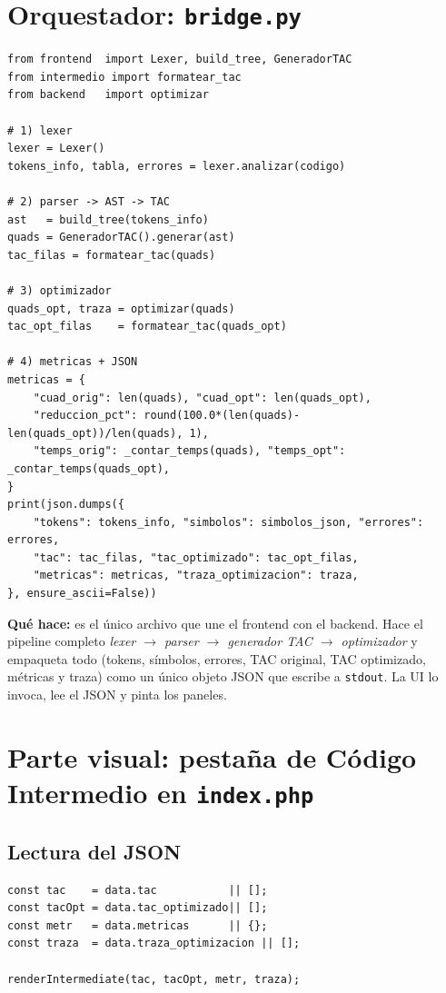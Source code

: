 \documentclass[11pt,a4paper]{article}
\begin{document}
\section{Orquestador: \texttt{bridge.py}}

\begin{lstlisting}[style=py]
from frontend  import Lexer, build_tree, GeneradorTAC
from intermedio import formatear_tac
from backend   import optimizar

# 1) lexer
lexer = Lexer()
tokens_info, tabla, errores = lexer.analizar(codigo)

# 2) parser -> AST -> TAC
ast   = build_tree(tokens_info)
quads = GeneradorTAC().generar(ast)
tac_filas = formatear_tac(quads)

# 3) optimizador
quads_opt, traza = optimizar(quads)
tac_opt_filas    = formatear_tac(quads_opt)

# 4) metricas + JSON
metricas = {
    "cuad_orig": len(quads), "cuad_opt": len(quads_opt),
    "reduccion_pct": round(100.0*(len(quads)-len(quads_opt))/len(quads), 1),
    "temps_orig": _contar_temps(quads), "temps_opt": _contar_temps(quads_opt),
}
print(json.dumps({
    "tokens": tokens_info, "simbolos": simbolos_json, "errores": errores,
    "tac": tac_filas, "tac_optimizado": tac_opt_filas,
    "metricas": metricas, "traza_optimizacion": traza,
}, ensure_ascii=False))
\end{lstlisting}

\textbf{Qué hace:} es el único archivo que une el frontend con el backend.
Hace el pipeline completo \emph{lexer $\to$ parser $\to$ generador TAC
$\to$ optimizador} y empaqueta todo (tokens, símbolos, errores, TAC
original, TAC optimizado, métricas y traza) como un único objeto JSON
que escribe a \texttt{stdout}. La UI lo invoca, lee el JSON y pinta los
paneles.

\section{Parte visual: pestaña de Código Intermedio en \texttt{index.php}}

\subsection{Lectura del JSON}

\begin{lstlisting}[style=js]
const tac    = data.tac           || [];
const tacOpt = data.tac_optimizado|| [];
const metr   = data.metricas      || {};
const traza  = data.traza_optimizacion || [];

renderIntermediate(tac, tacOpt, metr, traza);
\end{lstlisting}
\end{document}
